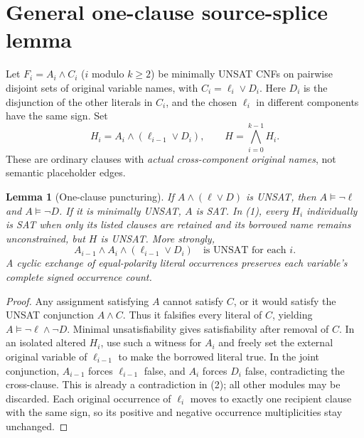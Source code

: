 \documentclass[11pt]{article}
\newtheorem{lemma}[theorem]{Lemma}
\begin{document}
\section{General one-clause source-splice lemma}
Let $F_i=A_i\wedge C_i$ ($i$ modulo $k\ge2$) be minimally UNSAT CNFs on pairwise disjoint sets of original variable names, with $C_i=\ell_i\vee D_i$. Here $D_i$ is the disjunction of the other literals in $C_i$, and the chosen $\ell_i$ in different components have the same sign. Set
\[
H_i=A_i\wedge(\ell_{i-1}\vee D_i),\qquad H=\bigwedge_{i=0}^{k-1}H_i.
\tag{1}
\]
These are ordinary clauses with \emph{actual cross-component original names}, not semantic placeholder edges.
\begin{lemma}[One-clause puncturing]\label{lem:puncture}
If $A\wedge(\ell\vee D)$ is UNSAT, then $A\models\neg\ell$ and $A\models\neg D$. If it is minimally UNSAT, $A$ is SAT. In (1), every $H_i$ individually is SAT when only its listed clauses are retained and its borrowed name remains unconstrained, but $H$ is UNSAT. More strongly,
\[
\boxed{\ A_{i-1}\wedge A_i\wedge(\ell_{i-1}\vee D_i)\quad\text{is UNSAT for each }i.\ }
\tag{2}
\]
A cyclic exchange of equal-polarity literal occurrences preserves each variable's complete signed occurrence count.
\end{lemma}
\begin{proof}
Any assignment satisfying $A$ cannot satisfy $C$, or it would satisfy the UNSAT conjunction $A\wedge C$. Thus it falsifies every literal of $C$, yielding $A\models\neg\ell\wedge\neg D$. Minimal unsatisfiability gives satisfiability after removal of $C$. In an isolated altered $H_i$, use such a witness for $A_i$ and freely set the external original variable of $\ell_{i-1}$ to make the borrowed literal true. In the joint conjunction, $A_{i-1}$ forces $\ell_{i-1}$ false, and $A_i$ forces $D_i$ false, contradicting the cross-clause. This is already a contradiction in (2); all other modules may be discarded. Each original occurrence of $\ell_i$ moves to exactly one recipient clause with the same sign, so its positive and negative occurrence multiplicities stay unchanged.\end{proof}
\end{document}
